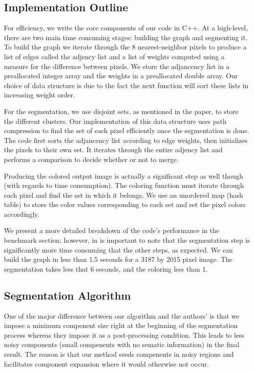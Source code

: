 \documentclass[12pt, english, titlepage]{article}
\begin{document}
\subsection{Implementation Outline}

For efficiency, we write the core components of our code in C++. At a high-level, there are two main time consuming stages: building the graph and segmenting it. To build the graph we iterate through the 8 nearest-neighbor pixels to produce a list of edges called the adjency list and a list of weights computed using a measure for the difference between pixels. We store the adjancency list in a preallocated integer array and the weights in a preallocated double array. Our choice of data structure is due to the fact the next function will sort these lists in increasing weight order.

For the segmentation, we use disjoint sets, as mentioned in the paper, to store the different clusters. Our implementation of this data structure uses path compression to find the set of each pixel efficiently once the segmentation is done. The code first sorts the adjancency list according to edge weights, then initializes the pixels to their own set. It iterates through the entire adjency list and performs a comparison to decide whether or not to merge.
	
Producing the colored output image is actually a significant step as well though (with regards to time consumption). The coloring function must iterate through each pixel and find the set in which it belongs. We use an unordered map (hash table) to store the color values corresponding to each set and set the pixel colors accordingly.

We present a more detailed breakdown of the code's performance in the benchmark section; however, in is important to note that the segmentation step is significantly more time consuming that the other steps, as expected. We can build the graph in less than 1.5 seconds for a 3187 by 2015 pixel image. The segmentation takes less that 6 seconds, and the coloring less than 1.
	
\subsection{ Segmentation Algorithm}

One of the major difference between our algorithm and the authors' is that we impose a minimum compenent size right at the beginning of the segmentation process whereas they impose it as a post-processing condition. This leads to less noisy components (small compenents with no sematic information) in the final result. The reason is that our method seeds compenents in noisy regions and facilitates component expansion where it would otherwise not occur.
\end{document}
